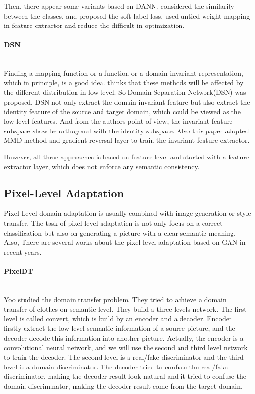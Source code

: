 \documentclass{kththesis}
\begin{document}
\noindent Then, there appear some variants based on DANN. \cite{tzeng2015simultaneous} considered the similarity between the classes, and proposed the soft label loss. \cite{tzeng2017adversarial} used untied weight mapping in feature extractor and reduce the difficult in optimization. 

\paragraph{DSN}~{}\\

\noindent Finding a mapping function or a function or a domain invariant representation, which in principle, is a good idea. \cite{bousmalis2016domain} thinks that these methods will be affected by the different distribution in low level. So Domain Separation Network(DSN) was proposed. DSN not only extract the domain invariant feature but also extract the identity feature of the source and target domain, which could be viewed as the low level features. And from the authors point of view, the invariant feature subspace show be orthogonal with the identity subspace. Also this paper adopted MMD\cite{gretton2012kernel} method and gradient reversal layer\cite{ganin2015unsupervised,ganin2016domain} to train the invariant feature extractor. 

\noindent However, all these approaches is based on feature level and started with a feature extractor layer, which does not enforce any semantic consistency\cite{hoffman2017cycada}. 

\subsection{Pixel-Level Adaptation}

Pixel-Level domain adaptation is usually combined with image generation or style transfer. The task of pixel-level adaptation is not only focus on a correct classification but also on generating a picture with a clear semantic meaning. Also, There are several works about the pixel-level adaptation based on GAN in recent years. 

\paragraph{PixelDT}~{}\\

\noindent Yoo\cite{yoo2016pixel} studied the domain transfer problem. They tried to achieve a domain transfer of clothes on semantic level. They build a three levels network. The first level is called convert, which is build by an encoder and a decoder. Encoder firstly extract the low-level semantic information of a source picture, and the decoder decode this information into another picture. Actually, the encoder is a convolutional neural network, and we will use the second and third level network to train the decoder. The second level is a real/fake discriminator and the third level is a domain discriminator. The decoder tried to confuse the real/fake discriminator, making the decoder result look natural and it tried to confuse the domain discriminator, making the decoder result come from the target domain. 
\end{document}
